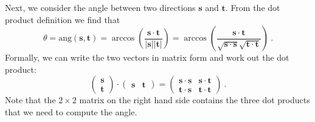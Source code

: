 Next, we consider the angle between two directions $\mathbf{s}$ and $\mathbf{t}$.  From the dot product definition we find that
\begin{equation}
	\theta = \text{ang}(\mathbf{s},\mathbf{t}) = \arccos\left( \frac{\mathbf{s}\cdot\mathbf{t}}{\vert\mathbf{s}\vert\vert\mathbf{t}\vert}\right) = 
	\arccos\left( \frac{\mathbf{s}\cdot\mathbf{t}}{\sqrt{\mathbf{s}\cdot\mathbf{s}}\sqrt{\mathbf{t}\cdot\mathbf{t}}}\right) \ .\label{eq:defangle}
\end{equation}
Formally, we can write the two vectors in matrix form and work out the dot product:
\[
	\left(\begin{array}{c}\mathbf{s}\\ \mathbf{t}\end{array}\right)\cdot\left(\begin{array}{cc}\mathbf{s}&\mathbf{t}\end{array}\right)
	 = \left(\begin{array}{cc}\mathbf{s}\cdot\mathbf{s}&\mathbf{s}\cdot\mathbf{t}\\
	\mathbf{t}\cdot\mathbf{s}&\mathbf{t}\cdot\mathbf{t}\end{array}\right) \ .
\]
Note that the $2\times 2$ matrix on the right hand side contains the three dot products that we need to compute the angle.  

